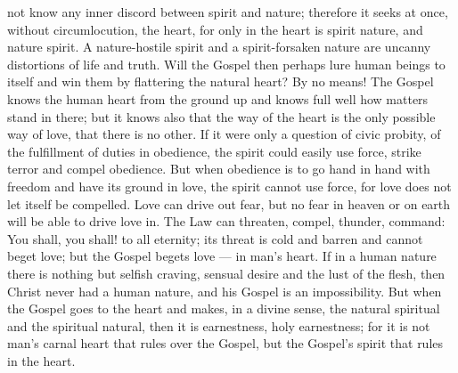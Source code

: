 \documentclass[12pt,a4paper,openany]{book}
\newcommand{\opage}[1]{\marginnote{\footnotesize\textit{[#1]}}}
\begin{document}
not know any inner discord between spirit and nature;
therefore it seeks at once, without circumlocution, the heart, for
only in the heart is spirit nature, and nature spirit. A
nature-hostile spirit and a spirit-forsaken nature are
\setcounter{footnote}{0}%
\opage{512}uncanny distortions of life and truth. Will the Gospel then
perhaps lure human beings to itself and win them by
flattering the natural heart? By no means! The Gospel
knows the human heart from the ground up and knows
full well how matters stand in there; but it knows
also that the way of the heart is the only possible
way of love, that there is no other. If it were only a question of
civic probity, of the fulfillment of duties in obedience,
the spirit could easily use force, strike terror
and compel obedience. But when obedience is to go
hand in hand with freedom and have its ground in love,
the spirit cannot use force, for love does not let itself be
compelled. Love can drive out fear, but no
fear in heaven or on earth will be able to
drive love in. The Law can threaten, compel, thunder,
command: You shall, you shall! to all eternity; its threat is
cold and barren and cannot beget love; but the Gospel
begets love --- in man's heart. If
in a human nature there is nothing but selfish
craving, sensual desire and the lust of the flesh, then
Christ never had a human nature, and his
Gospel is an impossibility. But when the Gospel goes
to the heart and makes, in a divine sense, the natural
spiritual and the spiritual natural, then it is earnestness,
holy earnestness; for it is not man's carnal
heart that rules over the Gospel, but the Gospel's spirit
that rules in the heart.
\end{document}
